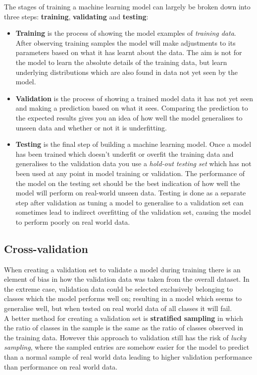 \documentclass[
    author={Kai Hulme},
    supervisor={Dr Jon Bird},
    degree={BSc},
    title={Generative Adversarial Networks as an Augmentation Technique},
    subtitle={for Alzheimer's Disease Detection in MRI Volumes},
    type={Research},
    year={2021} 
]{dissertation}
\begin{document}
The stages of training a machine learning model can largely be broken down into three steps: \textbf{training}, \textbf{validating} and \textbf{testing}:

\begin{itemize}
    \item \textbf{Training} is the process of showing the model examples of \textit{training data}. After observing training samples the model will make adjustments to its parameters based on what it has learnt about the data. The aim is not for the model to learn the absolute details of the training data, but learn underlying distributions which are also found in data not yet seen by the model.
    \item \textbf{Validation} is the process of showing a trained model data it has not yet seen and making a prediction based on what it sees. Comparing the prediction to the expected results gives you an idea of how well the model generalises to unseen data and whether or not it is underfitting. 
    \item \textbf{Testing} is the final step of building a machine learning model. Once a model has been trained which doesn't underfit or overfit the training data and generalises to the validation data you use a \textit{hold-out testing set} which has not been used at any point in model training or validation. The performance of the model on the testing set should be the best indication of how well the model will perform on real-world unseen data. Testing is done as a separate step after validation as tuning a model to generalise to a validation set can sometimes lead to indirect overfitting of the validation set, causing the model to perform poorly on real world data.
\end{itemize}

\subsection{Cross-validation}

When creating a validation set to validate a model during training there is an element of bias in how the validation data was taken from the overall dataset. In the extreme case, validation data could be selected exclusively belonging to classes which the model performs well on; resulting in a model which seems to generalise well, but when tested on real world data of all classes it will fail. \\

A better method for creating a validation set is \textbf{stratified sampling} in which the ratio of classes in the sample is the same as the ratio of classes observed in the training data. However this approach to validation still has the risk of \textit{lucky sampling}, where the sampled entries are somehow easier for the model to predict than a normal sample of real world data leading to higher validation performance than performance on real world data. \\
\end{document}
